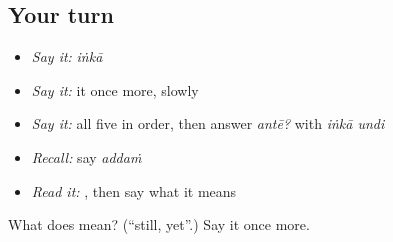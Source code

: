 \subsection*{Your turn}
\begin{itemize}
\raggedright
  \item \emph{Say it:} \emph{iṅkā}
  \item \emph{Say it:} it once more, slowly
  \item \emph{Say it:} all five in order, then answer \emph{antē?} with \emph{iṅkā undi}
  \item \emph{Recall:} say \emph{addaṁ}
  \item \emph{Read it:} \textbf{}, then say what it means
\end{itemize}

\begin{tcolorbox}[breakable,colback=teal!4,colframe=teal!35!black,title={Before you move on}]
What does  mean? (\textquotedblleft{}still, yet\textquotedblright{}.) Say it once more.
\end{tcolorbox}
